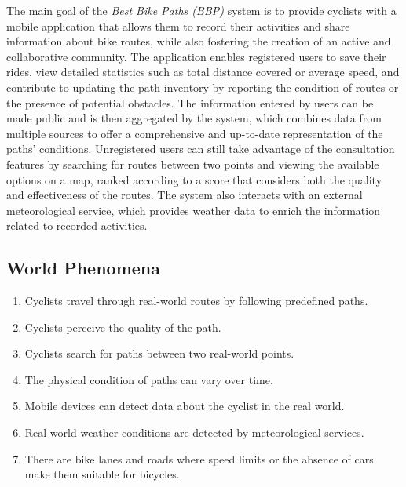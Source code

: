 The main goal of the \textit{Best Bike Paths (BBP)} system is to provide cyclists with a mobile application that allows them to record their activities and share information about bike routes, while also fostering the creation of an active and collaborative community.
The application enables registered users to save their rides, view detailed statistics such as total distance covered or average speed, and contribute to updating the path inventory by reporting the condition of routes or the presence of potential obstacles.
The information entered by users can be made public and is then aggregated by the system, which combines data from multiple sources to offer a comprehensive and up-to-date representation of the paths’ conditions.
Unregistered users can still take advantage of the consultation features by searching for routes between two points and viewing the available options on a map, ranked according to a score that considers both the quality and effectiveness of the routes.
The system also interacts with an external meteorological service, which provides weather data to enrich the information related to recorded activities.

\subsection{World Phenomena}
\begin{enumerate}[label=WP\arabic*.]
    \item Cyclists travel through real-world routes by following predefined paths.
    \item Cyclists perceive the quality of the path.
    \item Cyclists search for paths between two real-world points.
    \item The physical condition of paths can vary over time.
    \item Mobile devices can detect data about the cyclist in the real world.
    \item Real-world weather conditions are detected by meteorological services.
    \item There are bike lanes and roads where speed limits or the absence of cars make them suitable for bicycles.
\end{enumerate}

